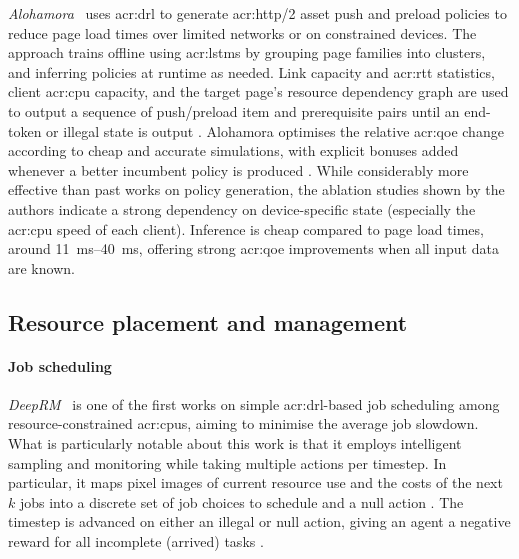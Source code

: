 \emph{Alohamora}~\parencite{DBLP:conf/nsdi/KansalRN21} uses \gls{acr:drl} to generate \gls{acr:http}/2 asset push and preload policies to reduce page load times over limited networks or on constrained devices.
The approach trains offline using \glspl{acr:lstm} by grouping page families into clusters, and inferring policies at runtime as needed.
Link capacity and \gls{acr:rtt} statistics, client \gls{acr:cpu} capacity, and the target page's resource dependency graph \prllitstate{} are used to output a sequence of push/preload item and prerequisite pairs until an end-token or illegal state is output \prllitact{}.
Alohamora optimises the relative \gls{acr:qoe} change according to cheap and accurate simulations, with explicit bonuses added whenever a better incumbent policy is produced \prllitreward{}.
While considerably more effective than past works on policy generation, the ablation studies shown by the authors indicate a strong dependency on device-specific state (especially the \gls{acr:cpu} speed of each client).
Inference is cheap compared to page load times, around \qtyrange{11}{40}{\milli\second}, offering strong \gls{acr:qoe} improvements when all input data are known.

\subsection{Resource placement and management}

\paragraph{Job scheduling}
\emph{DeepRM}~\parencite{DBLP:conf/hotnets/MaoAMK16} is one of the first works on simple \gls{acr:drl}-based job scheduling among resource-constrained \glspl{acr:cpu}, aiming to minimise the average job slowdown.
What is particularly notable about this work is that it employs intelligent sampling and monitoring while taking multiple actions per timestep.
In particular, it maps pixel images of current resource use and the costs of the next $k$ jobs \prllitstate{} into a discrete set of job choices to schedule and a null action \prllitact.
The timestep is advanced on either an illegal or null action, giving an agent a negative reward for all incomplete (arrived) tasks \prllitreward.

